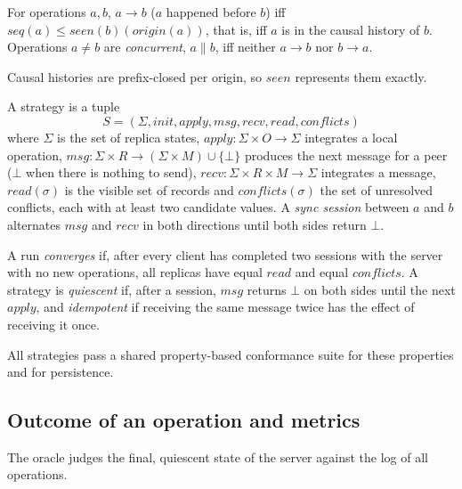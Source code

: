 \begin{definition}\label{def:hb}
For operations $a, b$, $a \to b$ ($a$ happened before $b$) iff $\mathit{seq}(a) \le
\mathit{seen}(b)(\mathit{origin}(a))$, that is, iff $a$ is in the causal history of $b$. Operations $a \neq b$ are
\emph{concurrent}, $a \parallel b$, iff neither $a \to b$ nor $b \to a$.
\end{definition}

Causal histories are prefix-closed per origin, so $\mathit{seen}$ represents them exactly.

\begin{definition}[Strategy]\label{def:strategy}
A strategy is a tuple
\[ S = (\Sigma, \mathit{init}, \mathit{apply}, \mathit{msg}, \mathit{recv}, \mathit{read}, \mathit{conflicts}) \]
where $\Sigma$ is the set of replica states, $\mathit{apply} : \Sigma \times O \to \Sigma$
integrates a local operation, $\mathit{msg} : \Sigma \times R \to (\Sigma \times M) \cup \{\bot\}$ produces the next
message for a peer ($\bot$ when there is nothing to send), $\mathit{recv} : \Sigma \times R \times M \to \Sigma$
integrates a message, $\mathit{read}(\sigma)$ is the visible set of records and $\mathit{conflicts}(\sigma)$ the set
of unresolved conflicts, each with at least two candidate values. A \emph{sync session} between $a$ and $b$
alternates $\mathit{msg}$ and $\mathit{recv}$ in both directions until both sides return $\bot$.
\end{definition}

\begin{definition}[Convergence]\label{def:convergence}
A run \emph{converges} if, after every client has completed two sessions with the server with no new operations,
all replicas have equal $\mathit{read}$ and equal $\mathit{conflicts}$. A strategy is \emph{quiescent} if, after a
session, $\mathit{msg}$ returns $\bot$ on both sides until the next $\mathit{apply}$, and \emph{idempotent} if
receiving the same message twice has the effect of receiving it once.
\end{definition}

All strategies pass a shared property-based conformance suite for these properties and for persistence.

\subsection{Outcome of an operation and metrics}

The oracle judges the final, quiescent state of the server against the log of all operations.

